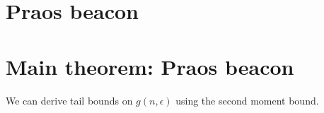 

\section{Praos beacon}














\section{Main theorem: Praos beacon}



We can derive tail bounds on $g(n,\epsilon)$ using the second moment bound.








